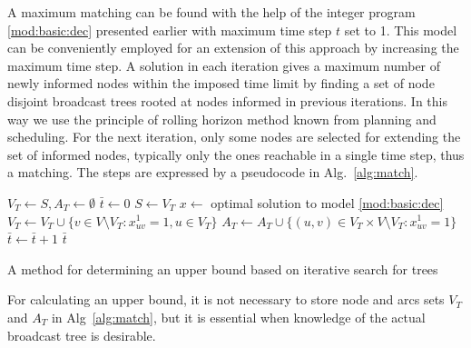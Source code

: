 A maximum matching can be found with the help of the integer program \eqref{mod:basic:dec} presented earlier with maximum time step $t$ set to 1.
This model can be conveniently employed for an extension of this approach by increasing the maximum time step.
A solution in each iteration gives a maximum number of newly informed nodes within the imposed time limit 
by finding a set of node disjoint broadcast trees rooted at nodes informed in previous iterations.
In this way we use the principle of rolling horizon method known from planning and scheduling.
For the next iteration, only some nodes are selected for extending the set of informed nodes, typically only the ones reachable in a single time step, thus a matching.
The steps are expressed by a pseudocode in Alg.~\ref{alg:match}.
\begin{algorithm}[]
$V_T\leftarrow S, A_T \leftarrow \emptyset$\;
$\bar{t}\leftarrow 0$\;
 {
	$S\leftarrow V_T$\;
	$x\leftarrow$ optimal solution to model \eqref{mod:basic:dec}\;
	$V_T\leftarrow V_T\cup \{v\in V\setminus V_T:x_{uv}^1=1, u\in V_T\}$\;
	$A_T\leftarrow A_T\cup \{(u,v)\in V_T\times V\setminus V_T: x_{uv}^1=1\}$\;
	$\bar{t}\leftarrow \bar{t}+1$\;
}
\Return $\bar{t}$\;
 \caption{A method for determining an upper bound based on iterative search for trees}
\label{alg:match}
\end{algorithm}

For calculating an upper bound, it is not necessary to store node and arcs sets $V_T$ and $A_T$ in Alg~\ref{alg:match},
but it is essential when knowledge of the actual broadcast tree is desirable.
